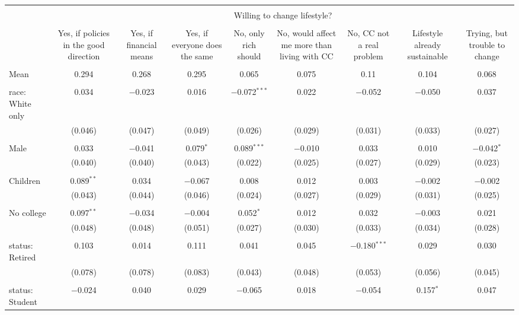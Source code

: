
\begin{tabular}{@{\extracolsep{5pt}}lcccccccc} 
\\[-1.8ex]\hline 
\hline \\[-1.8ex] 
 & \multicolumn{8}{c}{Willing to change lifestyle?} \\ 
\cline{2-9} 
\\[-1.8ex] & Yes, if policies in the good direction & Yes, if financial means & Yes, if everyone does the same & No, only rich should & No, would affect me more than living with CC & No, CC not a real problem & Lifestyle already sustainable & Trying, but trouble to change \\ 
\hline \\[-1.8ex] 
 Mean & 0.294 & 0.268 & 0.295 & 0.065 & 0.075 & 0.11 & 0.104 & 0.068  \\ \hline \\[-1.8ex] race: White only & 0.034 & $-$0.023 & 0.016 & $-$0.072$^{***}$ & 0.022 & $-$0.052 & $-$0.050 & 0.037 \\ 
  & (0.046) & (0.047) & (0.049) & (0.026) & (0.029) & (0.031) & (0.033) & (0.027) \\ 
  & & & & & & & & \\ 
 Male & 0.033 & $-$0.041 & 0.079$^{*}$ & 0.089$^{***}$ & $-$0.010 & 0.033 & 0.010 & $-$0.042$^{*}$ \\ 
  & (0.040) & (0.040) & (0.043) & (0.022) & (0.025) & (0.027) & (0.029) & (0.023) \\ 
  & & & & & & & & \\ 
 Children & 0.089$^{**}$ & 0.034 & $-$0.067 & 0.008 & 0.012 & 0.003 & $-$0.002 & $-$0.002 \\ 
  & (0.043) & (0.044) & (0.046) & (0.024) & (0.027) & (0.029) & (0.031) & (0.025) \\ 
  & & & & & & & & \\ 
 No college & 0.097$^{**}$ & $-$0.034 & $-$0.004 & 0.052$^{*}$ & 0.012 & 0.032 & $-$0.003 & 0.021 \\ 
  & (0.048) & (0.048) & (0.051) & (0.027) & (0.030) & (0.033) & (0.034) & (0.028) \\ 
  & & & & & & & & \\ 
 status: Retired & 0.103 & 0.014 & 0.111 & 0.041 & 0.045 & $-$0.180$^{***}$ & 0.029 & 0.030 \\ 
  & (0.078) & (0.078) & (0.083) & (0.043) & (0.048) & (0.053) & (0.056) & (0.045) \\ 
  & & & & & & & & \\ 
 status: Student & $-$0.024 & 0.040 & 0.029 & $-$0.065 & 0.018 & $-$0.054 & 0.157$^{*}$ & 0.047 \\ 

\end{tabular}
